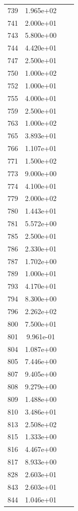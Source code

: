 \documentclass[12pt]{article}
\begin{document}
\begin{longtable}{@{}cccc@{}}
739 & 1.965e+02 &  &  \\
741 & 2.000e+01 &  &  \\
743 & 5.800e+00 &  &  \\
744 & 4.420e+01 &  &  \\
747 & 2.500e+01 &  &  \\
750 & 1.000e+02 &  &  \\
752 & 1.000e+01 &  &  \\
755 & 4.000e+01 &  &  \\
759 & 2.500e+01 &  &  \\
763 & 1.000e+02 &  &  \\
765 & 3.893e+01 &  &  \\
766 & 1.107e+01 &  &  \\
771 & 1.500e+02 &  &  \\
773 & 9.000e+00 &  &  \\
774 & 4.100e+01 &  &  \\
779 & 2.000e+02 &  &  \\
780 & 1.443e+01 &  &  \\
781 & 5.572e+00 &  &  \\
785 & 2.500e+01 &  &  \\
786 & 2.330e+01 &  &  \\
787 & 1.702e+00 &  &  \\
789 & 1.000e+01 &  &  \\
793 & 4.170e+01 &  &  \\
794 & 8.300e+00 &  &  \\
796 & 2.262e+02 &  &  \\
800 & 7.500e+01 &  &  \\
801 & 9.961e-01 &  &  \\
804 & 1.087e+00 &  &  \\
805 & 7.446e+00 &  &  \\
807 & 9.405e+00 &  &  \\
808 & 9.279e+00 &  &  \\
809 & 1.488e+00 &  &  \\
810 & 3.486e+01 &  &  \\
813 & 2.508e+02 &  &  \\
815 & 1.333e+00 &  &  \\
816 & 4.467e+00 &  &  \\
817 & 8.933e+00 &  &  \\
828 & 2.603e+01 &  &  \\
843 & 2.603e+01 &  &  \\
844 & 1.046e+01 &  &  \\

\end{longtable}
\end{document}
